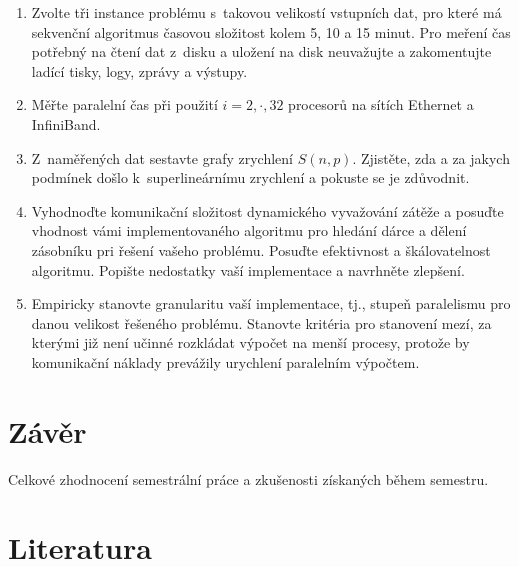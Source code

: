 \documentclass[12pt]{article}
\begin{document}
\begin{enumerate}
\item Zvolte tři instance problému s~takovou velikostí vstupních dat, pro které má
sekvenční algoritmus časovou složitost kolem 5, 10 a 15 minut. Pro
meření čas potřebný na čtení dat z~disku a uložení na disk
neuvažujte a zakomentujte ladící tisky, logy, zprávy a výstupy.
\item Měřte paralelní čas při použití $i=2,\cdot,32$ procesorů na sítích Ethernet a InfiniBand.
\item Z~naměřených dat sestavte grafy zrychlení $S(n,p)$. Zjistěte, zda a za jakych podmínek
došlo k~superlineárnímu zrychlení a pokuste se je zdůvodnit.
\item Vyhodnoďte komunikační složitost dynamického vyvažování zátěže a posuďte
vhodnost vámi implementovaného algoritmu pro hledání dárce a dělení
zásobníku pri řešení vašeho problému. Posuďte efektivnost a
škálovatelnost algoritmu. Popište nedostatky vaší implementace a
navrhněte zlepšení.
\item Empiricky stanovte
granularitu vaší implementace, tj., stupeň paralelismu pro danou
velikost řešeného problému. Stanovte kritéria pro stanovení mezí, za
kterými již není učinné rozkládat výpočet na menší procesy, protože
by komunikační náklady prevážily urychlení paralelním výpočtem.

\end{enumerate}

\section{Závěr}

Celkové zhodnocení semestrální práce a zkušenosti získaných během
semestru.

\section{Literatura}
\end{document}
